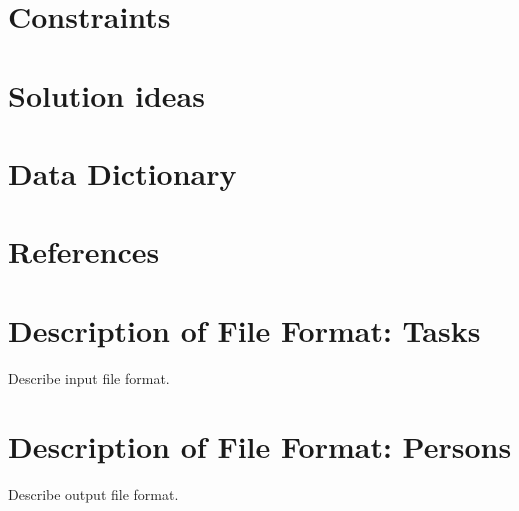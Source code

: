 \documentclass[12pt]{article}
\begin{document}
\section{Constraints}


\section{Solution ideas}

\section{Data Dictionary}

\section{References}

\appendix

\section{Description of File Format: Tasks}

Describe input file format.

\section{Description of File Format: Persons}

Describe output file format.
\end{document}
